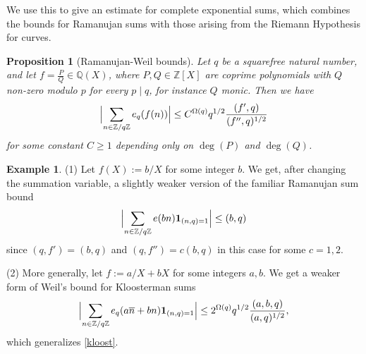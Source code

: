 \documentclass[12pt,a4paper,reqno]{amsart}
\numberwithin{equation}{section}
\theoremstyle{plain}
\newtheorem{proposition}[theorem]{Proposition}
\theoremstyle{definition}
\newtheorem{example}[theorem]{Example}
\newcommand\Z{\mathbb{Z}}
\newcommand\Q{\mathbb{Q}}
\newcommand{\onef}{\mathbf{1}}
\begin{document}
We use this to give an estimate for complete exponential sums, which
combines the bounds for  Ramanujan sums with those arising from the
Riemann Hypothesis for curves.

\begin{proposition}[Ramanujan-Weil bounds]\label{weil} Let $q$ be a
  squarefree natural number, and let $f = \frac{P}{Q}\in \Q(X)$, where
  $P,Q \in \Z[X]$ are coprime polynomials with $Q$
  non-zero modulo $p$ for every $p\mid q$, for instance $Q$
  monic. Then we have
$$ 
\Bigl|\sum_{n \in \Z/q\Z} e_q( f(n) )\Bigr| \leq C^{\Omega(q)}q^{1/2}
\frac{(f',q)}{(f'',q)^{1/2}}
$$
for some constant $C\geq 1$ depending only on $\deg(P)$ and $\deg(Q)$.
\end{proposition}

\begin{example}
  (1) Let $f(X):=b/X$ for some integer $b$. We get, after changing the
  summation variable, a slightly weaker version of the familiar
  Ramanujan sum bound
\begin{equation}\label{ram1}
  \Bigl|\sum_{n \in \Z/q\Z} e( b n) \onef_{(n,q)=1}\Bigr| \leq (b,q)
\end{equation}
since $(q,f')=(b,q)$ and $(q,f'') = c (b,q)$ in this case for some $c=1,2$.
\par
(2) More generally, let $f:=a/X+bX$ for some integers $a,b$. We get a
weaker form of Weil's bound for Kloosterman sums
$$ 
\Bigl|\sum_{n \in \Z/q\Z} e_q( a \overline{n} + bn )
\onef_{(n,q)=1}\Bigr| \leq 2^{\Omega(q)} q^{1/2}
\frac{(a,b,q)}{(a,q)^{1/2}},
$$ 
which generalizes \eqref{kloost}.
\end{example}
\end{document}
